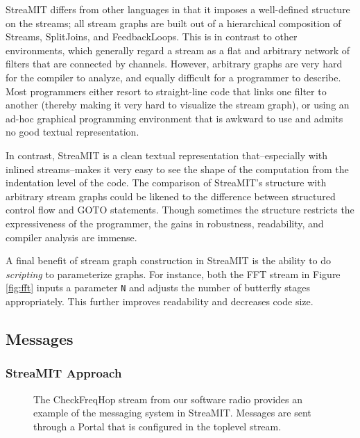 StreaMIT differs from other languages in that it imposes a
well-defined structure on the streams; all stream graphs are built out
of a hierarchical composition of Streams, SplitJoins, and
FeedbackLoops.  This is in contrast to other environments, which
generally regard a stream as a flat and arbitrary network of filters
that are connected by channels.  However, arbitrary graphs are very
hard for the compiler to analyze, and equally difficult for a
programmer to describe.  Most programmers either resort to
straight-line code that links one filter to another (thereby making it
very hard to visualize the stream graph), or using an ad-hoc graphical
programming environment that is awkward to use and admits no good
textual representation.

In contrast, StreaMIT is a clean textual representation
that--especially with inlined streams--makes it very easy to see the
shape of the computation from the indentation level of the code.  The
comparison of StreaMIT's structure with arbitrary stream graphs could
be likened to the difference between structured control flow and GOTO
statements.  Though sometimes the structure restricts the
expressiveness of the programmer, the gains in robustness,
readability, and compiler analysis are immense.

A final benefit of stream graph construction in StreaMIT is the
ability to do {\it scripting} to parameterize graphs.  For instance,
both the FFT stream in Figure \ref{fig:fft} inputs a parameter {\tt N}
and adjusts the number of butterfly stages appropriately.  This
further improves readability and decreases code size.

\subsection{Messages}

\subsubsection{StreaMIT Approach}

\begin{figure}
\caption{The CheckFreqHop stream from our software radio provides an example of the messaging system in StreaMIT.  Messages are sent through a Portal that is configured in the toplevel stream.}
\label{fig:portal-code}
\end{figure}


